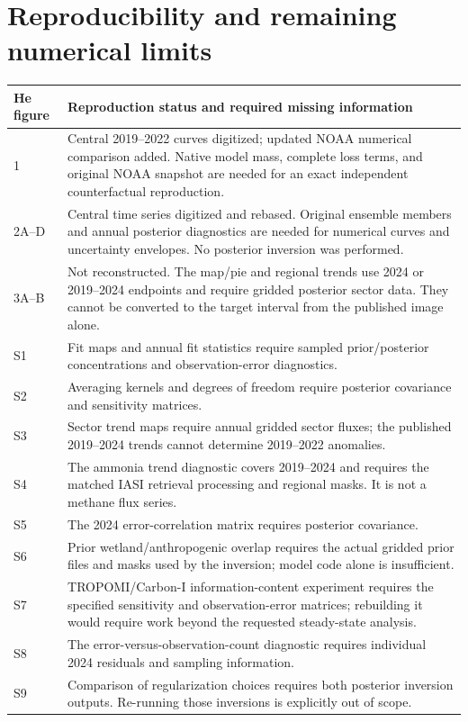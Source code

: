 \documentclass[11pt]{article}
\newcommand{\toprule}{\hline}
\newcommand{\midrule}{\hline}
\newcommand{\bottomrule}{\hline}
\begin{document}
\section{Reproducibility and remaining numerical limits}
\begin{longtable}{p{.17\linewidth}p{.76\linewidth}}
\toprule He figure & Reproduction status and required missing information\\\midrule
\endhead
1 & Central 2019--2022 curves digitized; updated NOAA numerical comparison
added. Native model mass, complete loss terms, and original NOAA snapshot
are needed for an exact independent counterfactual reproduction.\\
2A--D & Central time series digitized and rebased. Original ensemble members
and annual posterior diagnostics are needed for numerical curves and uncertainty
envelopes. No posterior inversion was performed.\\
3A--B & Not reconstructed. The map/pie and regional trends use 2024 or
2019--2024 endpoints and require gridded posterior sector data. They cannot
be converted to the target interval from the published image alone.\\
S1 & Fit maps and annual fit statistics require sampled prior/posterior
concentrations and observation-error diagnostics.\\
S2 & Averaging kernels and degrees of freedom require posterior covariance
and sensitivity matrices.\\
S3 & Sector trend maps require annual gridded sector fluxes; the published
2019--2024 trends cannot determine 2019--2022 anomalies.\\
S4 & The ammonia trend diagnostic covers 2019--2024 and requires the matched
IASI retrieval processing and regional masks. It is not a methane flux series.\\
S5 & The 2024 error-correlation matrix requires posterior covariance.\\
S6 & Prior wetland/anthropogenic overlap requires the actual gridded prior
files and masks used by the inversion; model code alone is insufficient.\\
S7 & TROPOMI/Carbon-I information-content experiment requires the specified
sensitivity and observation-error matrices; rebuilding it would require work
beyond the requested steady-state analysis.\\
S8 & The error-versus-observation-count diagnostic requires individual
2024 residuals and sampling information.\\
S9 & Comparison of regularization choices requires both posterior inversion
outputs. Re-running those inversions is explicitly out of scope.\\
\bottomrule
\end{longtable}
\end{document}
